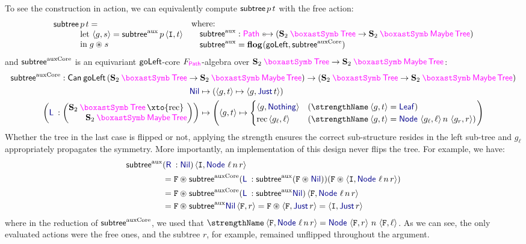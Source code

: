 To see the construction in action, we can equivalently compute $\mathsf{subtree} \, p\, t$
with the free action:
\[
\begin{array}{@{}l@{}l@{}}
\subtree \, &p\, t =
\\&\mathrm{let}\, \pair gs = \subtreeAux\,p \pair
\stet t
\\&
\mathrel{\mathrm{in}} g\act s
\end{array}
\quad
\begin{array}{@{}l@{}}
\text{where: }\\
\quad\subtreeAux : \TreePath
\equito (\gast[\Sym 2] \Tree \to \gast[\Sym 2]\Maybe\Tree)\\
\quad \subtreeAux = \flg(\goLeft, \subtreeAuxCore)
\end{array}
\]
and $\mathsf{subtree}^{\mathrm{auxCore}}$
is an equivariant $\mathsf{goLeft}$-core
$F_{\TreePath}$-algebra over $\gast[\Sym 2] \Tree \to \gast[\Sym
2]\Maybe\Tree$:
%
\begin{gather*}
\subtreeAuxCore : \Canon\goLeft\parent{\gast[\Sym 2]\Tree \to \gast[\Sym 2]\Maybe\Tree}
\to \parent{\gast[\Sym 2]\Tree \to \gast[\Sym 2]\Maybe\Tree}\\
\begin{aligned}
\Nil &\mapsto \parent{\fun{\pair gt} \pair g{\Just t}} \\
\parent{
    \Lft\::  \parent{\begin{array}{@{}l@{}}
    \gast[\Sym 2] \Tree \xto{\mathrm{rec}}\\
    \qquad\gast[\Sym 2]\Maybe\Tree
  \end{array}}
}&\mapsto \parent{\fun{\pair gt} \begin{cases}
  \pair g \Nothing
  & (\strength \pair gt = \Leaf) \\
  \mathrm{rec}\pair{g_\ell}\ell  & (\strength \pair gt = \Node\, {\pair{g_\ell}\ell} \, n \, \pair{g_r}r)
  \end{cases}}
\end{aligned}
\end{gather*}
%
Whether the tree in the last case is flipped or not, applying the
strength ensures the correct sub-structure resides in the left
sub-tree and $g_\ell$ appropriately propagates the symmetry. More
importantly, an implementation of this design never flips the tree. For example, we have:
\begin{align*}
\subtreeAux&(\Rgt\::\Nil)\pair\stet{\Node\,\ell\,n\,r} \\&=
\swap\act\subtreeAuxCore(\Lft\::\subtreeAux (\swap \act \Nil))(\swap \act \pair\stet{\Node\,\ell\,n\,r})\\&=
\swap\act\subtreeAuxCore(\Lft\::\subtreeAux \Nil)\pair\swap{\Node\,\ell\,n\,r}\\&=
\swap\act\subtreeAux \Nil\pair\swap r=
\swap\act\pair\swap{\Just r} =
\pair{\stet}{\Just r}
\end{align*}
%
where in the reduction of $\mathsf{subtree}^{\mathrm{auxCore}}$, we used that $\strength
\pair\swap{\Node\,\ell\,n\,r} = \Node\,\pair\swap r\,n\,\pair\swap
\ell$. As we can see, the only evaluated actions were the free ones,
and the subtree $r$, for example, remained unflipped throughout the
argument.

